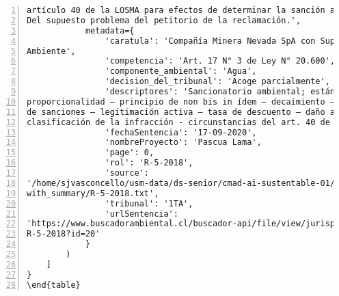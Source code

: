 \begin{Verbatim}[frame=lines, label=Elavoración propia -  Ejemplo de Contexto enviado por el Chatbot a OpenAI
				, fontsize=\scriptsize, numbers=left
				, baselinestretch=0.4
				, formatcom=\color{gray}]
artículo 40 de la LOSMA para efectos de determinar la sanción a aplicar a cada infracción. 4.8
Del supuesto problema del petitorio de la reclamación.',
            metadata={
                'caratula': 'Compañía Minera Nevada SpA con Superintendencia del Medio
Ambiente',
                'competencia': 'Art. 17 N° 3 de Ley N° 20.600',
                'componente_ambiental': 'Agua',
                'decision_del_tribunal': 'Acoge parcialmente',
                'descriptores': 'Sancionatorio ambiental; estándar de motivación –
proporcionalidad – principio de non bis in ídem – decaimiento – metodología de determinación
de sanciones – legitimación activa – tasa de descuento – daño ambiental – impacto ambiental –
clasificación de la infracción - circunstancias del art. 40 de la Ley N° 20.417',
                'fechaSentencia': '17-09-2020',
                'nombreProyecto': 'Pascua Lama',
                'page': 0,
                'rol': 'R-5-2018',
                'source':
'/home/sjvasconcello/usm-data/ds-senior/cmad-ai-sustentable-01/etl/load/../../data/clean/docs_
with_summary/R-5-2018.txt',
                'tribunal': '1TA',
                'urlSentencia':
'https://www.buscadorambiental.cl/buscador-api/file/view/jurisprudencia/S1TA Rol N°
R-5-2018?id=20'
            }
        )
    ]
}
\end{table}
\end{Verbatim}


